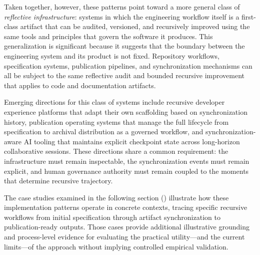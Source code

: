 Taken together, however, these patterns point toward a more general class of \textit{reflective infrastructure}: systems in which the engineering workflow itself is a first-class artifact that can be audited, versioned, and recursively improved using the same tools and principles that govern the software it produces. This generalization is significant because it suggests that the boundary between the engineering system and its product is not fixed. Repository workflows, specification systems, publication pipelines, and synchronization mechanisms can all be subject to the same reflective audit and bounded recursive improvement that  applies to code and documentation artifacts.

Emerging directions for this class of systems include recursive developer experience platforms that adapt their own scaffolding based on synchronization history, publication operating systems that manage the full lifecycle from specification to archival distribution as a governed workflow, and synchronization-aware AI tooling that maintains explicit checkpoint state across long-horizon collaborative sessions. These directions share a common requirement: the infrastructure must remain inspectable, the synchronization events must remain explicit, and human governance authority must remain coupled to the moments that determine recursive trajectory.

The case studies examined in the following section () illustrate how these implementation patterns operate in concrete contexts, tracing specific recursive workflows from initial specification through artifact synchronization to publication-ready outputs. Those cases provide additional illustrative grounding and process-level evidence for evaluating the practical utility---and the current limits---of the  approach without implying controlled empirical validation.
